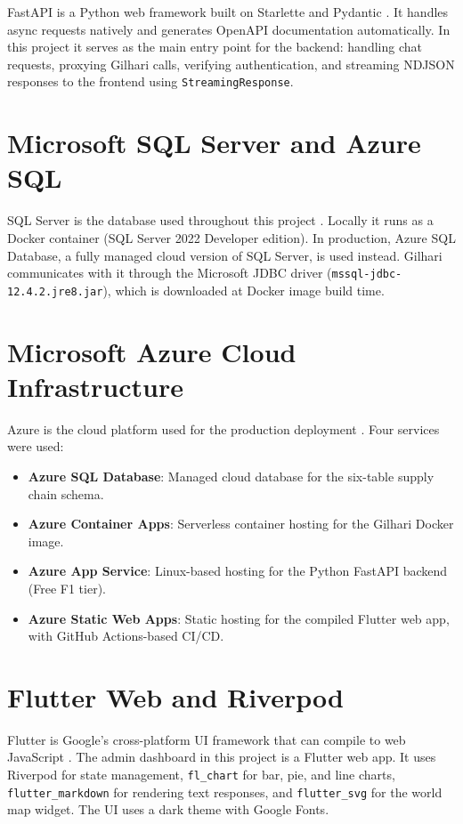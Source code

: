 \documentclass{book}
\begin{document}
FastAPI is a Python web framework built on Starlette and Pydantic \cite{fastapi}. It handles async requests natively and generates OpenAPI documentation automatically. In this project it serves as the main entry point for the backend: handling chat requests, proxying Gilhari calls, verifying authentication, and streaming NDJSON responses to the frontend using \texttt{StreamingResponse}.

\section{Microsoft SQL Server and Azure SQL}

SQL Server is the database used throughout this project \cite{mssql}. Locally it runs as a Docker container (SQL Server 2022 Developer edition). In production, Azure SQL Database, a fully managed cloud version of SQL Server, is used instead. Gilhari communicates with it through the Microsoft JDBC driver (\texttt{mssql-jdbc-12.4.2.jre8.jar}), which is downloaded at Docker image build time.

\section{Microsoft Azure Cloud Infrastructure}

Azure is the cloud platform used for the production deployment \cite{azure}. Four services were used:
\begin{itemize}[itemsep=0pt]
\item \textbf{Azure SQL Database}: Managed cloud database for the six-table supply chain schema.
\item \textbf{Azure Container Apps}: Serverless container hosting for the Gilhari Docker image.
\item \textbf{Azure App Service}: Linux-based hosting for the Python FastAPI backend (Free F1 tier).
\item \textbf{Azure Static Web Apps}: Static hosting for the compiled Flutter web app, with GitHub Actions-based CI/CD.
\end{itemize}

\section{Flutter Web and Riverpod}

Flutter is Google's cross-platform UI framework that can compile to web JavaScript \cite{flutter}. The admin dashboard in this project is a Flutter web app. It uses Riverpod for state management, \texttt{fl\_chart} for bar, pie, and line charts, \texttt{flutter\_markdown} for rendering text responses, and \texttt{flutter\_svg} for the world map widget. The UI uses a dark theme with Google Fonts.
\end{document}
